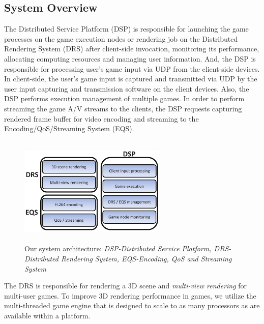 \documentclass[conference]{IEEEtran}
\begin{document}
    \subsection{System Overview}
    \label{sub:Overview}
    The Distributed Service Platform (DSP) is responsible for launching the game processes on the game execution nodes or rendering job on the Distributed Rendering System (DRS) after client-side invocation, monitoring its performance, allocating computing resources and managing user information.
    And, the DSP is responsible for processing user's game input via UDP from the client-side devices.
    In client-side, the user's game input is captured and transmitted via UDP by the user input capturing and transmission software on the client devices.
    Also, the DSP performs execution management of multiple games.
    In order to perform streaming the game A/V streams to the clients, the DSP requests capturing rendered frame buffer for video encoding and streaming to the Encoding/QoS/Streaming System (EQS).
    \begin{figure}[htb] %
    \centering
    \includegraphics[width=7cm,height=5.24cm,keepaspectratio]{figure01}
    \caption{Our system architecture: \emph{DSP-Distributed Service Platform, DRS-Distributed Rendering System, EQS-Encoding, QoS and Streaming System}}
    \label{fig:architecture}
    \end{figure}

    The DRS is responsible for rendering a 3D scene and \emph{multi-view rendering} for multi-user games.
    To improve 3D rendering performance in games, we utilize the multi-threaded game engine \cite{Smoke:2009} that is designed to scale to as many processors as are available within a platform.
\end{document}
